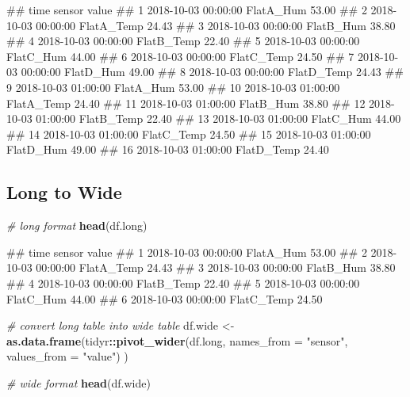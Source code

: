 \documentclass[
  a4paperpaper,
]{book}
\newenvironment{Shaded}{\begin{snugshade}}{\end{snugshade}}
\newcommand{\CommentTok}[1]{\textcolor[rgb]{0.56,0.35,0.01}{\textit{#1}}}
\newcommand{\DataTypeTok}[1]{\textcolor[rgb]{0.13,0.29,0.53}{#1}}
\newcommand{\KeywordTok}[1]{\textcolor[rgb]{0.13,0.29,0.53}{\textbf{#1}}}
\newcommand{\NormalTok}[1]{#1}
\newcommand{\OperatorTok}[1]{\textcolor[rgb]{0.81,0.36,0.00}{\textbf{#1}}}
\newcommand{\StringTok}[1]{\textcolor[rgb]{0.31,0.60,0.02}{#1}}
\let\oldShaded\Shaded
\let\endoldShaded\endShaded
\renewenvironment{Shaded}{\footnotesize\oldShaded}{\endoldShaded}
\let\oldverbatim\verbatim
\let\endoldverbatim\endverbatim
\renewenvironment{verbatim}{\footnotesize\oldverbatim}{\endoldverbatim}
\begin{document}
\begin{verbatim}
##                   time     sensor value
## 1  2018-10-03 00:00:00  FlatA_Hum 53.00
## 2  2018-10-03 00:00:00 FlatA_Temp 24.43
## 3  2018-10-03 00:00:00  FlatB_Hum 38.80
## 4  2018-10-03 00:00:00 FlatB_Temp 22.40
## 5  2018-10-03 00:00:00  FlatC_Hum 44.00
## 6  2018-10-03 00:00:00 FlatC_Temp 24.50
## 7  2018-10-03 00:00:00  FlatD_Hum 49.00
## 8  2018-10-03 00:00:00 FlatD_Temp 24.43
## 9  2018-10-03 01:00:00  FlatA_Hum 53.00
## 10 2018-10-03 01:00:00 FlatA_Temp 24.40
## 11 2018-10-03 01:00:00  FlatB_Hum 38.80
## 12 2018-10-03 01:00:00 FlatB_Temp 22.40
## 13 2018-10-03 01:00:00  FlatC_Hum 44.00
## 14 2018-10-03 01:00:00 FlatC_Temp 24.50
## 15 2018-10-03 01:00:00  FlatD_Hum 49.00
## 16 2018-10-03 01:00:00 FlatD_Temp 24.40
\end{verbatim}

\newpage

\hypertarget{long-to-wide}{%
\subsection{Long to Wide}\label{long-to-wide}}

\begin{Shaded}
\begin{Highlighting}[]
\CommentTok{# long format}
\KeywordTok{head}\NormalTok{(df.long)}
\end{Highlighting}
\end{Shaded}

\begin{verbatim}
##                  time     sensor value
## 1 2018-10-03 00:00:00  FlatA_Hum 53.00
## 2 2018-10-03 00:00:00 FlatA_Temp 24.43
## 3 2018-10-03 00:00:00  FlatB_Hum 38.80
## 4 2018-10-03 00:00:00 FlatB_Temp 22.40
## 5 2018-10-03 00:00:00  FlatC_Hum 44.00
## 6 2018-10-03 00:00:00 FlatC_Temp 24.50
\end{verbatim}

\begin{Shaded}
\begin{Highlighting}[]
\CommentTok{# convert long table into wide table}
\NormalTok{df.wide <-}\StringTok{ }\KeywordTok{as.data.frame}\NormalTok{(tidyr}\OperatorTok{::}\KeywordTok{pivot_wider}\NormalTok{(df.long,}
                                            \DataTypeTok{names_from =} \StringTok{"sensor"}\NormalTok{,}
                                            \DataTypeTok{values_from =} \StringTok{"value"}\NormalTok{)}
\NormalTok{                         )}

\CommentTok{# wide format}
\KeywordTok{head}\NormalTok{(df.wide)}
\end{Highlighting}
\end{Shaded}
\end{document}
